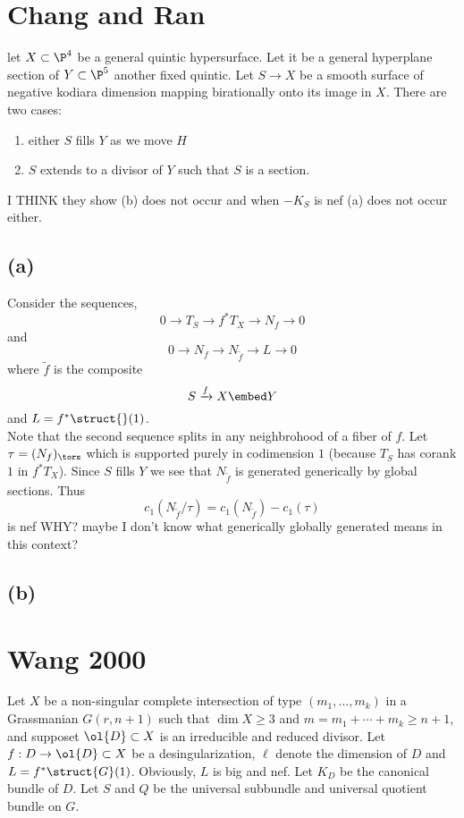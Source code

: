 \documentclass[12pt]{article}
\theoremstyle{plain}
\begin{document}
\section{Chang and Ran}

let $X \subset \P^4$ be a general quintic hypersurface. Let it be a general hyperplane section of $Y \subset \P^5$ another fixed quintic. Let $S \to X$ be a smooth surface of negative kodiara dimension mapping birationally onto its image in $X$. There are two cases:
\begin{enumerate}
\item either $S$ fills $Y$ as we move $H$
\item $S$ extends to a divisor of $Y$ such that $S$ is a section.
\end{enumerate}

I THINK they show (b) does not occur and when $-K_S$ is nef (a) does not occur either.

\subsection{(a)}

Consider the sequences,
\[ 0 \to T_S \to f^* T_{X} \to N_f \to 0 \]
and 
\[ 0 \to N_f \to N_{\tilde{f}} \to L \to 0 \]
where $\tilde{f}$ is the composite 
\[ S \xrightarrow{f} X \embed Y \]
and $L = f^* \struct{}(1)$. 
\bigskip\\
Note that the second sequence splits in any neighbrohood of a fiber of $f$. Let $\tau = (N_f)_{\tors}$ which is supported purely in codimension $1$ (because $T_S$ has corank $1$ in $f^* T_X$). Since $S$ fills $Y$ we see that $N_{\tilde{f}}$ is generated generically by global sections. Thus 
\[ c_1(N_{\tilde{f}} / \tau) = c_1(N_{\tilde{f}}) - c_1(\tau) \]
is nef {\color{red} WHY? maybe I don't know what generically globally generated means in this context?}

\subsection{(b)}



\section{Wang 2000}

Let $X$ be a non-singular complete intersection of type $(m_1, \dots, m_k)$ in a Grassmanian $G(r, n+1)$ such that $\dim{X} \ge 3$ and $m = m_1 + \cdots + m_k \ge n + 1$, and supposet $\ol{D} \subset X$ is an irreducible and reduced divisor. Let $f : D \to \ol{D} \subset X$ be a desingularization, $\ell$ denote the dimension of $D$ and $L = f^* \struct{G}(1)$. Obviously, $L$ is big and nef. Let $K_D$ be the canonical bundle of $D$. Let $S$ and $Q$ be the universal subbundle and universal quotient bundle on $G$. 
\end{document}
